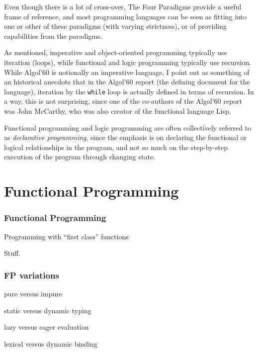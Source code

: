 \begin{frame}
\begin{annotation}
Even though there is a lot of cross-over, The Four Paradigms
provide a useful frame of reference, and most programming
languages can be seen as fitting into one or other of these
paradigms (with varying strictness), or of providing
capabilities from the paradigms.

As mentioned, imperative and object-oriented programming
typically use iteration (loops), while functional and logic
programming typically use recursion.  While Algol'60 is
notionally an imperative language, I point out as something of
an historical anecdote that in the Algol'60 report (the defining
document for the language), iteration by the \texttt{while} loop
is actually defined in terms of recursion.  In a way, this is
not surprising, since one of the co-authors of the Algol'60
report was John McCarthy, who was also creator of the functional
language Lisp.
\end{annotation}
\end{frame}

\begin{annotation}
Functional programming and logic programming are often
collectively referred to as \emph{declarative programming},
since the emphasis is on declaring the functional or
logical relationships in the program, and not so much on the
step-by-step execution of the program through changing state.
\end{annotation}

\section{Functional Programming}


\begin{frame}
\frametitle{Functional Programming}
\bi
\item Programming with ``first class'' functions
\ei
\end{frame}

\begin{annotation}
Stuff.
\end{annotation}

\begin{frame}
\frametitle{FP variations}
\bi
\item pure versus impure
\item static versus dynamic typing
\item lazy versus eager evaluation
\item lexical versus dynamic binding
\ei
\end{frame}

